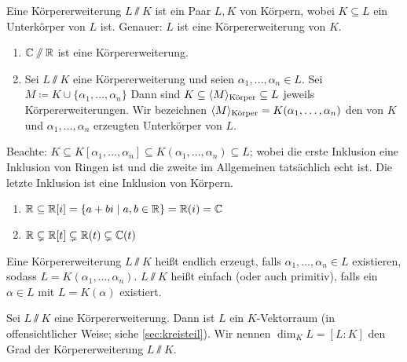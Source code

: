 \documentclass[12pt,a4paper]{scrartcl}
\begin{document}
\begin{defi}
	Eine Körpererweiterung $L\sslash K$ ist ein Paar $L, K$ von Körpern, wobei $K\subseteq L$ ein Unterkörper von $L$ ist. Genauer: $L$ ist eine Körpererweiterung von $K$.	
\end{defi}

\begin{bsp}
	\leavevmode
	\begin{enumerate}
		\item $\mathbb C\sslash\mathbb R$ ist eine Körpererweiterung.
		\item Sei $L\sslash K$ eine Körpererweiterung und seien $\alpha_1, \dots, \alpha_n\in L$. Sei $M \coloneqq K\cup \{\alpha_1,\dots, \alpha_n\}$ Dann sind $K \subseteq \langle M\rangle_{\text{Körper}}\subseteq L$ jeweils Körpererweiterungen. Wir bezeichnen $\langle M\rangle_{\text{Körper}} = K(\alpha_1,\dots, \alpha_n)$ den von $K$ und $\alpha_1,\dots,\alpha_n$ erzeugten Unterkörper von $L$.
	\end{enumerate}
\end{bsp}
Beachte: $K\subseteq K[\alpha_1,\dots, \alpha_n]\subseteq K(\alpha_1,\dots, \alpha_n)\subseteq L$; wobei die erste Inklusion eine Inklusion von Ringen ist und die zweite im Allgemeinen tatsächlich echt ist. Die letzte Inklusion ist eine Inklusion von Körpern.

\begin{bsp}
	\leavevmode
	\begin{enumerate}
		\item $\mathbb R\subseteq \mathbb R[i] = \{a+bi\mid a,b\in\mathbb R\} = \mathbb R(i) = \mathbb C$
		\item $\mathbb R\subsetneq \mathbb R[t]\subsetneq \mathbb R(t) \subsetneq \mathbb C(t)$
	\end{enumerate}
\end{bsp}

\begin{defi}
	Eine Körpererweiterung $L\sslash K$ heißt endlich erzeugt, falls $\alpha_1,\dots, \alpha_n\in L$ existieren, sodass $L = K(\alpha_1,\dots, \alpha_n)$. $L\sslash K$ heißt einfach (oder auch primitiv), falls ein $\alpha\in L$ mit $L = K(\alpha)$ existiert.
\end{defi}

\begin{defi}
	Sei $L\sslash K$ eine Körpererweiterung. Dann ist $L$ ein $K$-Vektorraum (in offensichtlicher Weise; siehe \cref{sec:kreisteil}). Wir nennen $\dim_KL = [L:K]$ den Grad der Körpererweiterung $L\sslash K$.
\end{defi}
\end{document}
